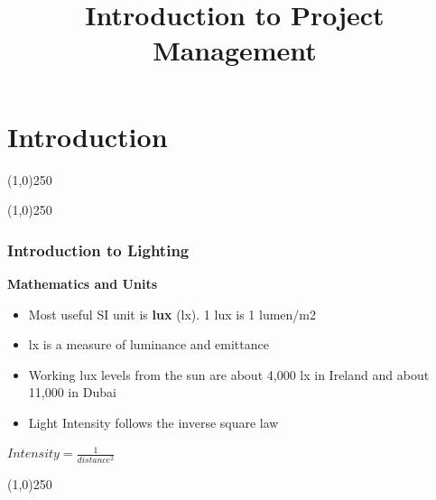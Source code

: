 



%
\title[Introduction to Project Management]{Introduction to Project Management}



%
\usetikzlibrary{arrows}



\newpage




\thispagestyle{empty}
\tableofcontents
\newpage
\section{Introduction}


\begin{frame}
\titlepage
\end{frame}\begin{center}\line(1,0){250}\end{center}
%
%
\begin{center}\line(1,0){250}\end{center}



\begin{frame}
\frametitle{Introduction to Lighting}
\textbf{Mathematics and Units}
\begin{itemize}
	\item Most useful SI unit is \textbf{lux} (lx). 1 lux is 1 lumen/m2
	\item lx is a measure of luminance and emittance
	\item Working lux levels from the sun are about 4,000 lx in Ireland and about 11,000 in Dubai
	\item Light Intensity follows the inverse square law
\end{itemize}

\begin{center}
$Intensity = \frac{1}{distance^2}$
\end{center}

\end{frame}
\begin{center}\line(1,0){250}\end{center}




